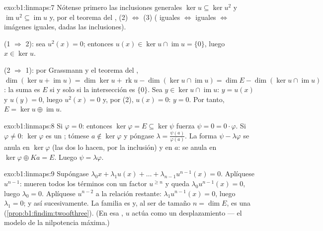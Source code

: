 \begin{solution}{exo:b1:linmaps:7}
Nótense primero las inclusiones generales $\ker u \subseteq \ker u^2$
y $\operatorname{im} u^2 \subseteq \operatorname{im} u$ y, por el
teorema del , (2) $\iff$ (3) ( iguales $\iff$ 
iguales $\iff$ imágenes iguales, dadas las inclusiones).

(1 $\Rightarrow$ 2): sea $u^2(x) = 0$; entonces
$u(x) \in \ker u \cap \operatorname{im} u = \{0\}$, luego $x \in \ker u$.

(2 $\Rightarrow$ 1): por Grassmann y el teorema del ,
$\dim(\ker u + \operatorname{im} u) = \dim\ker u +
\operatorname{rk} u - \dim(\ker u \cap \operatorname{im} u) =
\dim E - \dim(\ker u \cap \operatorname{im} u)$: la suma es $E$ si y
solo si la intersección es $\{0\}$. Sea
$y \in \ker u \cap \operatorname{im} u$: $y = u(x)$ y $u(y) = 0$,
luego $u^2(x) = 0$ y, por (2), $u(x) = 0$: $y = 0$. Por tanto,
$E = \ker u \oplus \operatorname{im} u$.
\end{solution}

\begin{solution}{exo:b1:linmaps:8}
Si $\varphi = 0$: entonces $\ker\varphi = E \subseteq \ker\psi$
fuerza $\psi = 0 = 0\cdot\varphi$. Si $\varphi \neq 0$:
$\ker\varphi$ es un ; tómese $a \notin \ker\varphi$ y
póngase $\lambda = \frac{\psi(a)}{\varphi(a)}$. La forma
$\psi - \lambda\varphi$ se anula en $\ker\varphi$ (las dos lo hacen,
por la inclusión) y en $a$: se anula en
$\ker\varphi \oplus Ka = E$. Luego $\psi = \lambda\varphi$.
\end{solution}

\begin{solution}{exo:b1:linmaps:9}
Supóngase $\lambda_0 x + \lambda_1 u(x) + \dots + \lambda_{n-1}
u^{n-1}(x) = 0$. Aplíquese $u^{n-1}$: mueren todos los términos con
un factor $u^{\geq n}$ y queda $\lambda_0 u^{n-1}(x) = 0$, luego
$\lambda_0 = 0$. Aplíquese $u^{n-2}$ a la relación restante:
$\lambda_1 u^{n-1}(x) = 0$, luego $\lambda_1 = 0$; y así
sucesivamente. La familia es  y, al ser de tamaño
$n = \dim E$, es una  (\cref{prop:b1:findim:twoofthree}). (En
esa , $u$ actúa como un desplazamiento --- el modelo de la
nilpotencia máxima.)
\end{solution}

